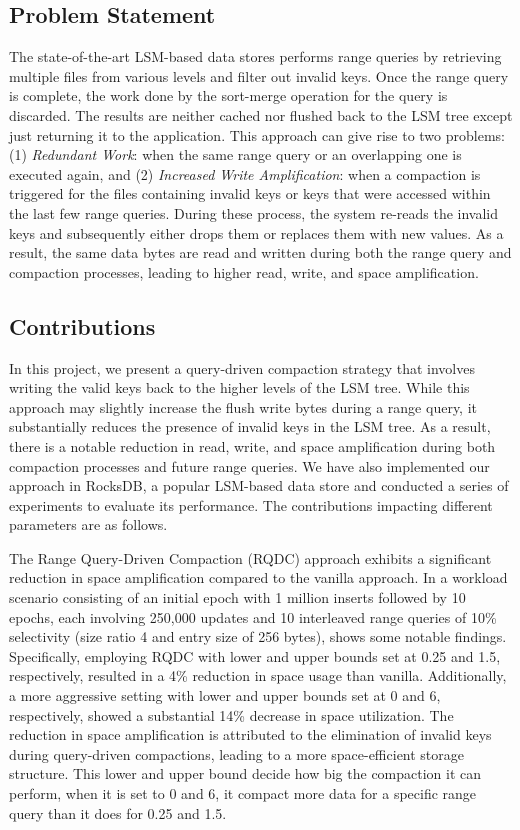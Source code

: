 \subsection{Problem Statement}
The state-of-the-art LSM-based data stores performs range queries by retrieving multiple files from various levels and 
filter out invalid keys. Once the range query is complete, the work done by the sort-merge operation for the query is 
discarded. The results are neither cached nor flushed back to the LSM tree except just returning it to the application. This 
approach can give rise to two problems: (1) \textit{Redundant Work}: when the same range query or 
an overlapping one is executed again, and (2) \textit{Increased Write Amplification}: when a compaction is triggered 
for the files containing invalid keys or keys that were accessed within the last few range queries. During these process, 
the system re-reads the invalid keys and subsequently either drops them or replaces them with new values. As a result, 
the same data bytes are read and written during both the range query and compaction processes, leading to higher read, 
write, and space amplification.


\subsection{Contributions}
In this project, we present a query-driven compaction strategy that involves writing the valid keys back to the higher 
levels of the LSM tree. While this approach may slightly increase the flush write bytes during a range query, it 
substantially reduces the presence of invalid keys in the LSM tree. As a result, there is a notable reduction in read, 
write, and space amplification during both compaction processes and future range queries. We have also implemented our
approach in RocksDB, a popular LSM-based data store and conducted a series of experiments to evaluate its performance.
The contributions impacting different parameters are as follows.

The Range Query-Driven Compaction (RQDC) approach exhibits a significant reduction in space amplification compared to 
the vanilla approach. In a workload scenario consisting of an initial epoch with 1 million inserts followed by 10 
epochs, each involving 250,000 updates and 10 interleaved range queries of 10\% selectivity (size ratio 4 and entry size of 256 bytes), 
shows some notable findings. Specifically, employing RQDC with lower and upper bounds set at 0.25 and 1.5, 
respectively, resulted in a 4\% reduction in space usage than vanilla. Additionally, a more aggressive setting with lower and upper 
bounds set at 0 and 6, respectively, showed a substantial 14\% decrease in space utilization. The reduction in space 
amplification is attributed to the elimination of invalid keys during query-driven compactions, leading to a more 
space-efficient storage structure. This lower and upper bound decide how big the compaction it can perform, when it is set
to 0 and 6, it compact more data for a specific range query than it does for 0.25 and 1.5.

